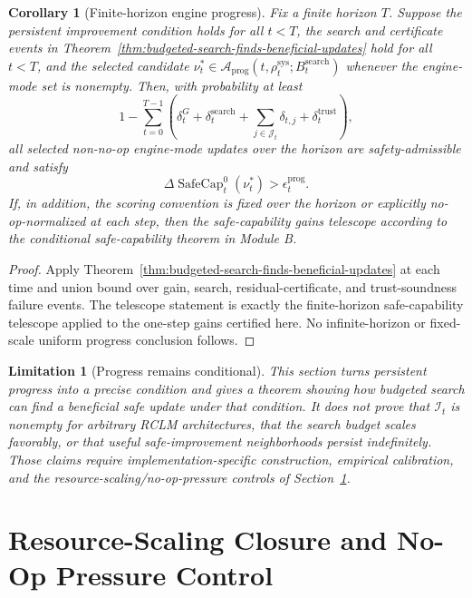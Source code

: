 \documentclass[11pt,a4paper]{article}
\newtheorem{corollary}[theorem]{Corollary}
\newtheorem{limitation}[theorem]{Limitation}
\newcommand{\Acal}{\mathcal A}
\newcommand{\sys}{\mathrm{sys}}
\newcommand{\SafeCap}{\operatorname{SafeCap}}
\newcommand{\search}{\mathrm{search}}
\newcommand{\trust}{\mathrm{trust}}
\begin{document}
\begin{corollary}[Finite-horizon engine progress]
\label{cor:finite-horizon-engine-progress}
Fix a finite horizon \(T\).  Suppose the persistent improvement condition holds for all \(t<T\), the search and certificate events in Theorem~\ref{thm:budgeted-search-finds-beneficial-updates} hold for all \(t<T\), and the selected candidate \(\nu_t^*\in\Acal_{\mathrm{prog}}(t,\rho_t^{\sys};B_t^{\search})\) whenever the engine-mode set is nonempty.  Then, with probability at least
\[
1-
\sum_{t=0}^{T-1}
\left(\delta_t^{G}+\delta_t^{\search}+\sum_{j\in\mathcal J_t}\delta_{t,j}+\delta_t^{\trust}\right),
\]
all selected non-no-op engine-mode updates over the horizon are safety-admissible and satisfy
\[
\Delta\SafeCap_t^{0}(\nu_t^*)>\epsilon_t^{\mathrm{prog}}.
\]
If, in addition, the scoring convention is fixed over the horizon or explicitly no-op-normalized at each step, then the safe-capability gains telescope according to the conditional safe-capability theorem in Module B.
\end{corollary}

\begin{proof}
Apply Theorem~\ref{thm:budgeted-search-finds-beneficial-updates} at each time and union bound over gain, search, residual-certificate, and trust-soundness failure events.  The telescope statement is exactly the finite-horizon safe-capability telescope applied to the one-step gains certified here.  No infinite-horizon or fixed-scale uniform progress conclusion follows.
\end{proof}

\begin{limitation}[Progress remains conditional]
\label{lim:persistent-progress-conditional}
This section turns persistent progress into a precise condition and gives a theorem showing how budgeted search can find a beneficial safe update under that condition.  It does not prove that \(\mathcal I_t\) is nonempty for arbitrary RCLM architectures, that the search budget scales favorably, or that useful safe-improvement neighborhoods persist indefinitely.  Those claims require implementation-specific construction, empirical calibration, and the resource-scaling/no-op-pressure controls of Section~\ref{sec:resource-noop-pressure}.
\end{limitation}

\section{Resource-Scaling Closure and No-Op Pressure Control}
\label{sec:resource-noop-pressure}
\end{document}
